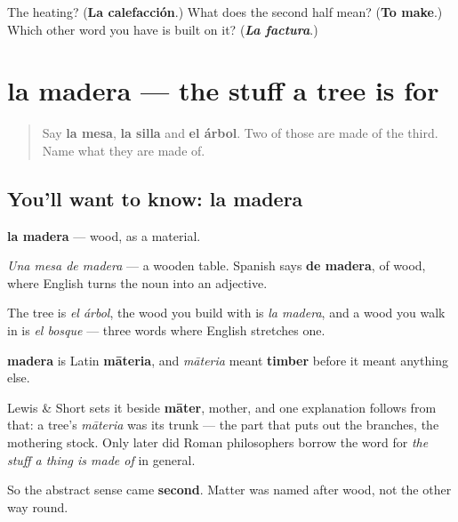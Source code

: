 \begin{tcolorbox}[breakable,colback=teal!4,colframe=teal!35!black,title={Before you move on}]
The heating? (\textbf{La calefacción}.) What does the second half mean? (\textbf{To make}.) Which other word you have is built on it? (\emph{\textbf{La factura}}.)
\end{tcolorbox}
\section[la madera]{la madera — the stuff a tree is for}

\label{lesson:ES-C444-madera}



\begin{quote}
Say \textbf{la mesa}, \textbf{la silla} and \textbf{el árbol}. Two of those are made of the third. Name what they are made of.
\end{quote}

\subsection*{You'll want to know: la madera}
\textbf{la madera} — wood, as a material.

\emph{Una mesa de madera} — a wooden table. Spanish says \textbf{de madera}, of wood, where English turns the noun into an adjective.

The tree is \emph{el árbol}, the wood you build with is \emph{la madera}, and a wood you walk in is \emph{el bosque} — three words where English stretches one.

\begin{cousinweb}
\textbf{madera} is Latin \textbf{māteria}, and \emph{māteria} meant \textbf{timber} before it meant anything else.

Lewis \& Short sets it beside \textbf{māter}, mother, and one explanation follows from that: a tree's \emph{māteria} was its trunk — the part that puts out the branches, the mothering stock. Only later did Roman philosophers borrow the word for \emph{the stuff a thing is made of} in general.

So the abstract sense came \textbf{second}. Matter was named after wood, not the other way round.
\end{cousinweb}

